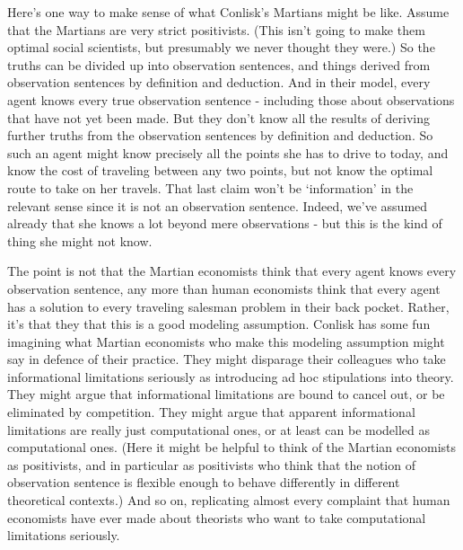 \documentclass[
  12pt,
  letterpaper,
]{scrbook}
\begin{document}
Here's one way to make sense of what Conlisk's Martians might be like.
Assume that the Martians are very strict positivists. (This isn't going
to make them optimal social scientists, but presumably we never thought
they were.) So the truths can be divided up into observation sentences,
and things derived from observation sentences by definition and
deduction. And in their model, every agent knows every true observation
sentence - including those about observations that have not yet been
made. But they don't know all the results of deriving further truths
from the observation sentences by definition and deduction. So such an
agent might know precisely all the points she has to drive to today, and
know the cost of traveling between any two points, but not know the
optimal route to take on her travels. That last claim won't be
`information' in the relevant sense since it is not an observation
sentence. Indeed, we've assumed already that she knows a lot beyond mere
observations - but this is the kind of thing she might not know.

The point is not that the Martian economists think that every agent
knows every observation sentence, any more than human economists think
that every agent has a solution to every traveling salesman problem in
their back pocket. Rather, it's that they that this is a good modeling
assumption. Conlisk has some fun imagining what Martian economists who
make this modeling assumption might say in defence of their practice.
They might disparage their colleagues who take informational limitations
seriously as introducing ad hoc stipulations into theory. They might
argue that informational limitations are bound to cancel out, or be
eliminated by competition. They might argue that apparent informational
limitations are really just computational ones, or at least can be
modelled as computational ones. (Here it might be helpful to think of
the Martian economists as positivists, and in particular as positivists
who think that the notion of observation sentence is flexible enough to
behave differently in different theoretical contexts.) And so on,
replicating almost every complaint that human economists have ever made
about theorists who want to take computational limitations seriously.
\end{document}
